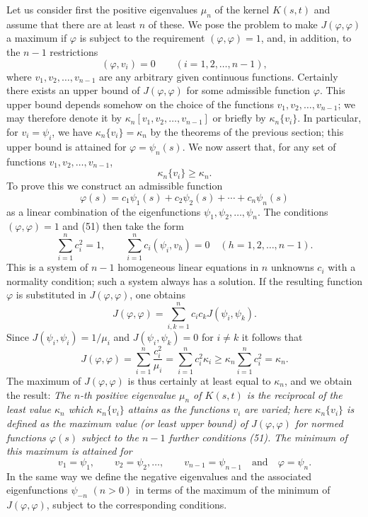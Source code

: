 Let us consider first the positive eigenvalues $\mu_n$ of the kernel $K(s,t)$ and assume that there are at least $n$ of these. We pose the problem to make $J(\varphi,\varphi)$ a maximum if $\varphi$ is subject to the requirement $(\varphi,\varphi)=1$, and, in addition, to the $n-1$ restrictions
\begin{equation}\tag{51}
(\varphi,v_i)=0\qquad(i=1,2,\ldots,n-1),
\end{equation}
where $v_1,v_2,\ldots,v_{n-1}$ are any arbitrary given continuous functions. Certainly there exists an upper bound of $J(\varphi,\varphi)$ for some admissible function $\varphi$. This upper bound depends somehow on the choice of the functions $v_1,v_2,\ldots,v_{n-1}$; we may therefore denote it by $\kappa_n[v_1,v_2,\ldots,v_{n-1}]$ or briefly by $\kappa_n\{v_i\}$. In particular, for $v_i=\psi_i$, we have $\kappa_n\{v_i\}=\kappa_n$ by the theorems of the previous section; this upper bound is attained for $\varphi=\psi_n(s)$. We now assert that, for any set of functions $v_1,v_2,\ldots,v_{n-1}$,
\[
\kappa_n\{v_i\}\ge\kappa_n.
\]
To prove this we construct an admissible function
\[
\varphi(s)=c_1\psi_1(s)+c_2\psi_2(s)+\cdots+c_n\psi_n(s)
\]
as a linear combination of the eigenfunctions $\psi_1,\psi_2,\ldots,\psi_n$. The conditions $(\varphi,\varphi)=1$ and (51) then take the form
\[
\sum_{i=1}^{n}c_i^2=1,
\qquad
\sum_{i=1}^{n}c_i(\psi_i,v_h)=0
\quad(h=1,2,\ldots,n-1).
\]
This is a system of $n-1$ homogeneous linear equations in $n$ unknowns $c_i$ with a normality condition; such a system always has a solution. If the resulting function $\varphi$ is substituted in $J(\varphi,\varphi)$, one obtains
\[
J(\varphi,\varphi)=\sum_{i,k=1}^{n}c_i c_k J(\psi_i,\psi_k).
\]
Since $J(\psi_i,\psi_i)=1/\mu_i$ and $J(\psi_i,\psi_k)=0$ for $i\ne k$ it follows that
\[
J(\varphi,\varphi)=\sum_{i=1}^{n}\frac{c_i^2}{\mu_i}
=\sum_{i=1}^{n}c_i^2\kappa_i
\ge\kappa_n\sum_{i=1}^{n}c_i^2
=\kappa_n.
\]
The maximum of $J(\varphi,\varphi)$ is thus certainly at least equal to $\kappa_n$, and we obtain the result: \emph{The $n$-th positive eigenvalue $\mu_n$ of $K(s,t)$ is the reciprocal of the least value $\kappa_n$ which $\kappa_n\{v_i\}$ attains as the functions $v_i$ are varied; here $\kappa_n\{v_i\}$ is defined as the maximum value (or least upper bound) of $J(\varphi,\varphi)$ for normed functions $\varphi(s)$ subject to the $n-1$ further conditions (51). The minimum of this maximum is attained for}
\[
v_1=\psi_1,
\qquad v_2=\psi_2,\ldots,
\qquad v_{n-1}=\psi_{n-1}
\quad\text{and}\quad \varphi=\psi_n.
\]
In the same way we define the negative eigenvalues and the associated eigenfunctions $\psi_{-n}$ $(n>0)$ in terms of the maximum of the minimum of $J(\varphi,\varphi)$, subject to the corresponding conditions.

